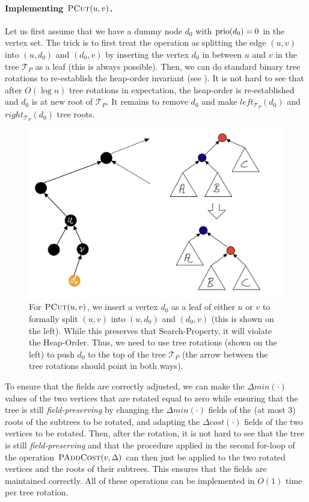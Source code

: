 \paragraph{Implementing $\textsc{PCut}(u,v)$.} Let us first assume that we have a dummy node $d_0$ with $\operatorname{prio}(d_0) = 0$ in the vertex set. The trick is to first treat the operation as splitting the edge $(u,v)$ into $(u,d_0)$ and $(d_0,v)$ by inserting the vertex $d_0$ in between $u$ and $v$ in the tree $\mathcal{T}_{P}$ as a leaf (this is always possible). Then, we can do standard binary tree rotations to re-establish the heap-order invariant (see ). It is not hard to see that after $O(\log n)$ tree rotations in expectation, the heap-order is re-established and $d_0$ is at new root of $\mathcal{T}_{P}$. It remains to remove $d_0$ and make $left_{\mathcal{T}_{P}}(d_0)$ and $right_{\mathcal{T}_{P}}(d_0)$ tree roots.

\begin{figure}[!ht]
    \centering
    \includegraphics[scale=0.2]{./fig/PathCutOperation_lectureDynamicTree.jpeg}
    \caption{For $\textsc{PCut}(u,v)$, we insert a vertex $d_0$ as a leaf of either $u$ or $v$ to formally split $(u,v)$ into $(u,d_0)$ and $(d_0,v)$ (this is shown on the left). While this preserves that Search-Property, it will violate the Heap-Order. Thus, we need to use tree rotations (shown on the left) to push $d_0$ to the top of the tree $\mathcal{T}_{P}$ (the arrow between the tree rotations should point in both ways).
    }
    \label{fig:TODOFIX}
\end{figure}

To ensure that the fields are correctly adjusted, we can make the $\Delta min(\cdot)$ values of the two vertices that are rotated equal to zero while ensuring that the tree is still \emph{field-preserving} by changing the $\Delta min(\cdot)$ fields of the (at most 3) roots of the subtrees to be rotated, and adapting the $\Delta cost(\cdot)$ fields of the two vertices to be rotated. Then, after the rotation, it is not hard to see that the tree is still \emph{field-preserving} and that the procedure applied in the second for-loop of the operation $\textsc{PAddCost}(v, \Delta)$ can then just be applied to the two rotated vertices and the roots of their subtrees. This ensures that the fields are maintained correctly. All of these operations can be implemented in $O(1)$ time per tree rotation.

